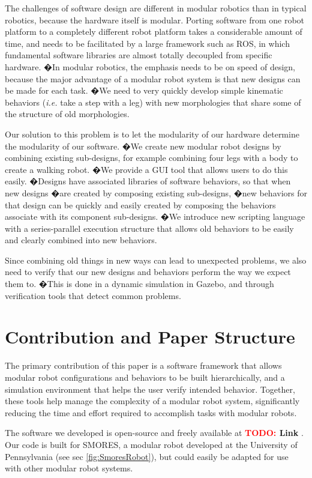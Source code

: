 \documentclass[conference]{IEEEtran}
\theoremstyle{definition}
\newcommand{\TODO}[1]{ {\bf \textcolor{red}{TODO:} #1 }}
\begin{document}
The challenges of software design are different in modular robotics than
in typical robotics, because the hardware itself is modular. Porting software
from one robot platform to a completely different robot platform takes a
considerable amount of time, and needs to be facilitated by a large framework
such as ROS, in which fundamental software libraries are almost totally decoupled from
specific hardware. �In modular robotics, the emphasis needs to be on speed of
design, because the major advantage of a modular robot system is that new
designs can be made for each task. �We need to  very quickly develop simple kinematic
behaviors (\textit{i.e.} take a step with a leg) with new morphologies that share some of the
structure of old morphologies.

Our solution to this problem is to let the modularity of our hardware determine the
modularity of our software. �We create new modular robot designs by combining existing sub-designs,
for example combining four legs with a body to create a walking robot.
�We provide a GUI tool that allows users to do this easily. �Designs have
associated libraries of software behaviors, so that when new designs �are created
by composing existing sub-designs, �new behaviors for that design can be quickly
and easily created by composing the behaviors associate with its component
sub-designs. �We introduce new scripting language with a series-parallel
execution structure that allows old behaviors to be easily and clearly combined
into new behaviors.

Since combining old things in new ways can lead to unexpected problems, we also
need to verify that our new designs and behaviors perform the way we expect them
to. �This is done in a dynamic simulation in Gazebo, and through
verification tools that detect common problems.


\section{Contribution and Paper Structure}

The primary contribution of this paper is a software framework that allows modular
robot configurations and behaviors to be built hierarchically, and a simulation
environment that helps the user verify intended behavior.  Together, these tools
help manage the complexity of a modular robot system, significantly reducing the
time and effort required to accomplish tasks with modular robots.

The software we developed is open-source and freely available at\TODO{Link}.  Our
code is built for SMORES,  a modular robot developed at the University of
Pennsylvania (see sec \ref{fig:SmoresRobot}), but could easily be adapted for use with
other modular robot systems.
\end{document}
